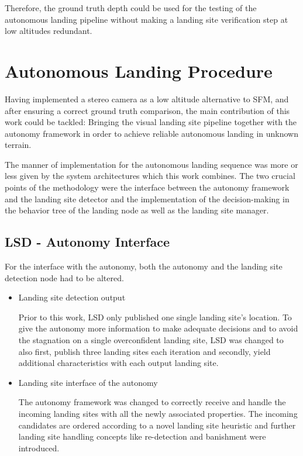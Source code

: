 Therefore, the ground truth depth could be used for the testing of the autonomous landing pipeline without making a landing site verification step at low altitudes redundant.

\section{Autonomous Landing Procedure}

Having implemented a stereo camera as a low altitude alternative to SFM, and after ensuring a correct ground truth comparison, the main contribution of this work could be tackled: Bringing the visual landing site pipeline together with the autonomy framework in order to achieve reliable autonomous landing in unknown terrain.

The manner of implementation for the autonomous landing sequence was more or less given by the system architectures which this work combines. The two crucial points of the methodology were the interface between the autonomy framework and the landing site detector and the implementation of the decision-making in the behavior tree of the landing node as well as the landing site manager.

\subsection{LSD - Autonomy Interface}

For the interface with the autonomy, both the autonomy and the landing site detection node had to be altered.

\begin{itemize}
    \item Landing site detection output

    Prior to this work, LSD only published one single landing site's location. To give the autonomy more information to make adequate decisions and to avoid the stagnation on a single overconfident landing site, LSD was changed to also first, publish three landing sites each iteration and secondly, yield additional characteristics with each output landing site.
    \item Landing site interface of the autonomy

    The autonomy framework was changed to correctly receive and handle the incoming landing sites with all the newly associated properties. The incoming candidates are ordered according to a novel landing site heuristic and further landing site handling concepts like re-detection and banishment were introduced.    
\end{itemize}

